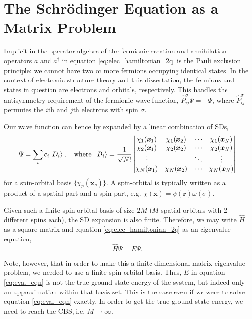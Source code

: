 \section{The Schr\"odinger Equation as a Matrix Problem}
\label{sec:matrix}

Implicit in the operator algebra of the fermionic creation and annihilation operators $a$ and $a^\dag$ in equation \eqref{eq:elec_hamiltonian_2q} is the Pauli exclusion principle: we cannot have two or more fermions occupying identical states. In the context of electronic structure theory and this dissertation, the fermions and states in question are electrons and orbitals, respectively. This handles the antisymmetry requirement of the fermionic wave function, $\hat P_{ij}^\sigma\Psi = -\Psi$, where $\hat P_{ij}^\sigma$ permutes the $i$th and $j$th electrons with spin $\sigma$.

Our wave function can hence by expanded by a linear combination of \glspl{SD},
\begin{equation}
    \label{eq:SD_expansion}
\Psi = \sum_i c_i \ket{D_i},
\quad \text{where } \ket{D_i} =
\frac 1{\sqrt{N!}}\left|
    \begin{matrix}
        \chi_1(\bm x_1) & \chi_1(\bm x_2) & \cdots & \chi_1(\bm x_N)\\
        \chi_2(\bm x_1) & \chi_2(\bm x_2) & \cdots & \chi_2(\bm x_N)\\
        \vdots & \vdots & \ddots & \vdots\\
        \chi_N(\bm x_1) & \chi_N(\bm x_2) & \cdots & \chi_N(\bm x_N)\\
    \end{matrix}
 \right|
\end{equation}
for a spin-orbital basis $\{\chi_p(\bm x_q)\}$. A spin-orbital is typically written as a product of a spatial part and a spin part, e.g. $\chi(\bm x) = \phi(\bm r)\omega(\sigma)$.

Given such a finite spin-orbital basis of size $2M$ ($M$ spatial orbitals with 2 different spins each), the \gls{SD} expansion is also finite. Therefore, we may write $\hat H$ as a square matrix and equation \eqref{eq:elec_hamiltonian_2q} as an eigenvalue equation,
\begin{equation}
\label{eq:eval_eqn}
\hat H\Psi = E\Psi.
\end{equation}

Note, however, that in order to make this a finite-dimensional matrix eigenvalue problem, we needed to use a finite spin-orbital basis. Thus, $E$ in equation \eqref{eq:eval_eqn} is not the true ground state energy of the system, but indeed only an approximation within that basis set. This is the case even if we were to solve equation \eqref{eq:eval_eqn} exactly. In order to get the true ground state energy, we need to reach the \gls{CBS}, i.e. $M\to\infty$.

